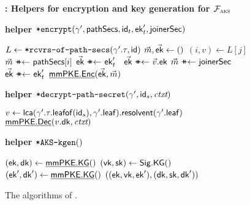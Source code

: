 \begin{figure*}[!p]
  \medskip
  \begin{anybox}{\sffamily\bfseries \saik : Helpers for encryption and key generation for $\mathcal{F}_{\normalfont\textsc{aks}}$}
			\begin{minipage}[t]{.49\linewidth}
        {\bf {helper ${\textnormal{\tt*encrypt}}(\gamma', {\mathsf{pathSecs}}, {\mathsf{id}}_t, {\mathsf{ek}}_t', {\mathsf{joinerSec}})$}}
				\begin{algorithmic}
          \State $L \gets {\ensuremath{\textnormal{\tt*rcvrs-of-path-secs}}}(\gamma'.\tau, {\mathsf{id}})$
          \State $\vec m, \vec {{\mathsf{ek}}} \gets ()$
            \State $(i, v) \gets L[j]$
            \State $\vec m \ \texttt{+\!\!+$\gets$}\  {\mathsf{pathSecs}}[i]$
              $\vec {{\mathsf{ek}}} \ \texttt{+\!\!+$\gets$}\  {\mathsf{ek}}_t'$
            \Else\
              $\vec {{\mathsf{ek}}} \ \texttt{+\!\!+$\gets$}\  \vec v.{\mathsf{ek}}$
            \EndIf
          \EndFor
            \State $\vec m \ \texttt{+\!\!+$\gets$}\  {\mathsf{joinerSec}}$
            \State $\vec{{\mathsf{ek}}} \ \texttt{+\!\!+$\gets$}\  {\mathsf{ek}}_t'$
          \EndIf
          \State \Return $\underline{{\mathsf{mmPKE}}.{\mathsf{Enc}}}(\vec{{\mathsf{ek}}}, \vec m)$
        \end{algorithmic}
      \end{minipage}
		\hfill
			\begin{minipage}[t]{0.49\linewidth}
        {\bf {helper ${\textnormal{\tt*decrypt-path-secret}}(\gamma', {\mathsf{id}}_s, {\normalfont\textit{ctxt}})$}}
				\begin{algorithmic}
          \State $v \gets {\ensuremath{\mathsf{lca}}}(\gamma'.\tau.{\mathsf{leafof}}({\mathsf{id}}_s), \gamma'.{\mathsf{leaf}}).{\mathsf{resolvent}}(\gamma'.{\mathsf{leaf}})$
          \State \Return $\underline{{\mathsf{mmPKE}}.{\mathsf{Dec}}}(v.{\mathsf{dk}}, {\normalfont\textit{ctxt}})$
        \end{algorithmic}

        \medskip
        {\bf {helper ${\textnormal{\tt*AKS-kgen}}()$}}
				\begin{algorithmic}
          \State $({\mathsf{ek}}, {\mathsf{dk}}) \gets \underline{{\mathsf{mmPKE}}.{\mathsf{KG}}}()$
          \State $({\mathsf{vk}}, {\mathsf{sk}}) \gets {\ensuremath{\mathsf{Sig}}}.{\mathsf{KG}}()$
          \State $({\mathsf{ek}}', {\mathsf{dk}}') \gets \underline{{\mathsf{mmPKE}}.{\mathsf{KG}}}()$
          \State \Return $(({\mathsf{ek}}, {\mathsf{vk}}, {\mathsf{ek}}'), ({\mathsf{dk}}, {\mathsf{sk}}, {\mathsf{dk}}'))$
        \end{algorithmic}
      \end{minipage}
  \end{anybox}
	\vspace*{-0.7em}
	\caption{The algorithms of \saik.}
	\label{fig:prot1}
\end{figure*}


